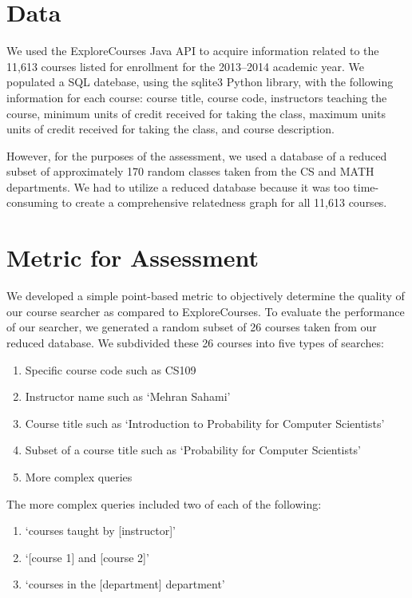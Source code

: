 \documentclass[12pt]{article}
\begin{document}
\section*{Data}
We used the ExploreCourses Java API to acquire information related to
the 11,613 courses listed for enrollment for the 2013–2014 academic
year. We populated a SQL datebase, using the sqlite3 Python library,
with the following information for each course: course title, course
code, instructors teaching the course, minimum units of credit
received for taking the class, maximum units units of credit received
for taking the class, and course description.

However, for the purposes of the assessment, we used a database of a
reduced subset of approximately 170 random classes taken from the CS
and MATH departments. We had to utilize a reduced database because it
was too time-consuming to create a comprehensive relatedness graph for
all 11,613 courses.

\section*{Metric for Assessment}
We developed a simple point-based metric to objectively determine the
quality of our course searcher as compared to ExploreCourses. To
evaluate the performance of our searcher, we generated a random subset
of 26 courses taken from our reduced database. We subdivided these 26
courses into five types of searches: 

\begin{enumerate}
\item Specific course code such as CS109
\item Instructor name such as `Mehran Sahami'
\item Course title such as `Introduction to Probability for Computer Scientists'
\item Subset of a course title such as `Probability for Computer Scientists'
\item More complex queries
\end{enumerate}

The more complex queries included two of each of the following: 


\begin{enumerate}
\item `courses taught by [instructor]'
\item `[course 1] and [course 2]'
\item `courses in the [department] department'
\end{enumerate}
\end{document}
